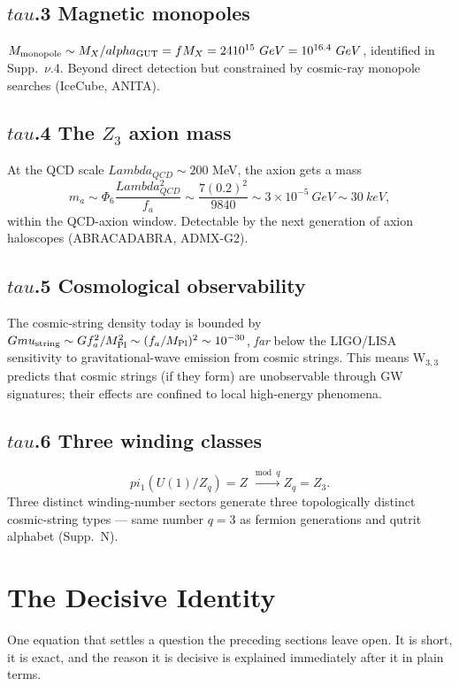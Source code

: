 \documentclass[12pt,a4paper]{article}
\def\mathbb#1{#1}%
\def\mathrm#1{#1}%
\def\text#1{#1}%
\def\alpha{alpha}%
\def\Lambda{Lambda}%
\def\mu{mu}%
\def\Phi#1{Phi#1}%
\def\pi{pi}%
\def\tau{tau}%
\def\cdot{ }%
\theoremstyle{definition}
\newcommand{\ZZ}{\mathbb{Z}}
\begin{document}
\subsection*{$\tau$.3 \quad Magnetic monopoles}
$M_{\rm monopole}\sim M_X/\alpha_{\rm GUT} = f\cdot M_X = 24\cdot 10^{15}\ \text{GeV}
= 10^{16.4}\ \text{GeV}$, identified in Supp.~$\nu$.4. Beyond direct
detection but constrained by cosmic-ray monopole searches (IceCube,
ANITA).

\subsection*{$\tau$.4 \quad The $\ZZ_3$ axion mass}
At the QCD scale $\Lambda_{QCD} \sim 200$ MeV, the axion gets a mass
\[
m_a \sim \Phi_6\cdot \frac{\Lambda_{QCD}^2}{f_a} \sim \frac{7\cdot (0.2)^2}{9840} \sim 3\times 10^{-5}\ \text{GeV} \sim 30\ \text{keV},
\]
within the QCD-axion window. Detectable by the next generation of
axion haloscopes (ABRACADABRA, ADMX-G2).

\subsection*{$\tau$.5 \quad Cosmological observability}
The cosmic-string density today is bounded by
$G\mu_{\rm string} \sim G f_a^2 / M_{\rm Pl}^2 \sim (f_a/M_{\rm Pl})^2 \sim 10^{-30}$,
\emph{far} below the LIGO/LISA sensitivity to gravitational-wave
emission from cosmic strings. This means W$_{3,3}$ predicts that
cosmic strings (if they form) are unobservable through GW signatures;
their effects are confined to local high-energy phenomena.

\subsection*{$\tau$.6 \quad Three winding classes}
\[
\pi_1(\mathrm{U}(1)/\ZZ_q) = \ZZ \xrightarrow{\bmod q} \ZZ_q = \ZZ_3.
\]
Three distinct winding-number sectors generate three topologically
distinct cosmic-string types — same number $q=3$ as fermion
generations and qutrit alphabet (Supp.~N).

\section*{The Decisive Identity}

\begin{plainbox}
One equation that settles a question the preceding sections leave open. It is short,
it is exact, and the reason it is decisive is explained immediately after it in plain
terms.
\end{plainbox}
\end{document}
